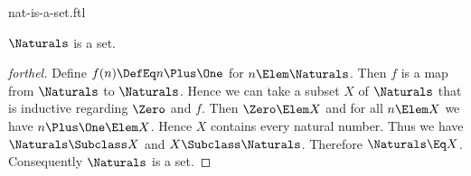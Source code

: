 \documentclass{stex}
\begin{document}
\begin{smodule}{nat-is-a-set.ftl}


\begin{proposition*}[forthel]
  $\Naturals$ is a set.
\end{proposition*}
\begin{proof}[forthel]
  Define $f(n) \DefEq n \Plus \One$ for $n \Elem \Naturals$.
  Then $f$ is a map from $\Naturals$ to $\Naturals$.
  Hence we can take a subset $X$ of $\Naturals$ that is inductive regarding
  $\Zero$ and $f$.
  Then $\Zero \Elem X$ and for all $n \Elem X$ we have $n \Plus \One \Elem X$.
  Hence $X$ contains every natural number.
  Thus we have $\Naturals \Subclass X$ and $X \Subclass \Naturals$.
  Therefore $\Naturals \Eq X$.
  Consequently $\Naturals$ is a set.
\end{proof}

\end{smodule}
\end{document}
